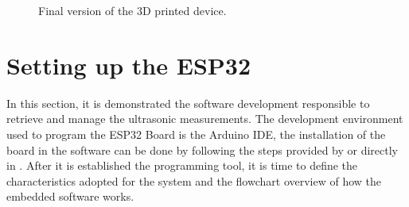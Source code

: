 \begin{figure}[h!]
    \centering
    \caption{Final version of the 3D printed device.}
    \label{fig:final3Dmodel}
\end{figure}


\section{Setting up the ESP32}\label{section:settingESP32}

In this section, it is demonstrated the software development responsible to retrieve and manage the ultrasonic measurements. The development environment used to program the ESP32 Board is the Arduino \gls{IDE}, the installation of the board in the software can be done by following the steps provided by \cite{KURNIAWAN:2019} or directly in \cite{ESPRESSIF:ESP32}. After it is established the programming tool, it is time to define the characteristics adopted for the system and the flowchart overview of how the embedded software works. 


